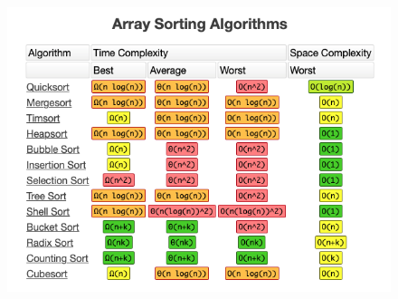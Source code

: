 \documentclass{article}
\begin{document}
\begin{figure}[!ht]
  \includegraphics[width=\linewidth]{Images/ArraySortAlg.png}
  \label{fig:Chart3}
\end{figure}
\end{document}
